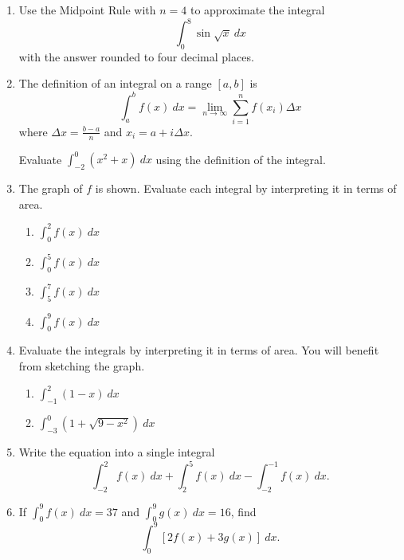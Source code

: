 \documentclass[letterpaper,11pt]{article}
\begin{document}
\begin{enumerate}
    \item Use the Midpoint Rule with $n=4$ to approximate the integral
    \[\int_0^8 \sin{\sqrt{x}} \ dx\]
    with the answer rounded to four decimal places.
    \vfill

    \item The definition of an integral on a range $[a,b]$ is
    \[\int_a^b f(x) \ dx = \lim_{n\to \infty} \sum_{i=1}^n f(x_i) \Delta x\]
    where $\Delta x = \frac{b-a}{n}$ and $x_i = a + i \Delta x$.
    
    Evaluate $\int_{-2}^0 (x^2 + x) \ dx$ using the definition of the integral.
    \vfill
    \newpage
    \item The graph of $f$ is shown. Evaluate each integral by interpreting it in terms of area.
    \begin{center}
    \end{center}
    \begin{enumerate}
        \item $\displaystyle \int_0^2 f(x) \ dx$
        \vfill
        \item $\displaystyle \int_0^5 f(x) \ dx$
        \vfill
        \item $\displaystyle \int_5^7 f(x) \ dx$
        \vfill
        \item $\displaystyle \int_0^9 f(x) \ dx$
        \vfill
    \end{enumerate}
    \newpage
    \item Evaluate the integrals by interpreting it in terms of area. You will benefit from sketching the graph.
    \begin{enumerate}
        \item $\displaystyle \int_{-1}^2 (1-x) \ dx$
        \vfill
        \item $\displaystyle \int_{-3}^0 (1 + \sqrt{9-x^2}) \ dx$
        \vfill
    \end{enumerate}
    \newpage
    \item Write the equation into a single integral
    \[\int_{-2}^2 f(x) \ dx + \int_2^5 f(x) \ dx - \int_{-2}^{-1} f(x) \ dx.\]
    \vfill
    \item If $\int_0^9 f(x) \ dx = 37$ and $\int_0^9 g(x) \ dx = 16$, find 
    \[\int_0^9 [2f(x) + 3g(x)] \ dx.\]
    \vfill
\end{enumerate}
\end{document}

